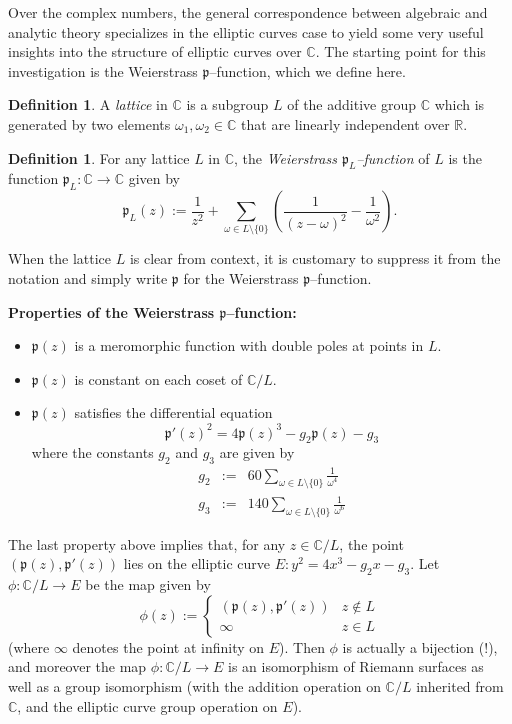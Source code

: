 \documentclass[12pt]{article}
\newcommand{\p}{{\mathfrak{p}}}
\newcommand{\C}{\mathbb{C}}
\newcommand{\R}{\mathbb{R}}
\theoremstyle{definition}
\newtheorem{definition}[theorem]{Definition}
\begin{document}
Over the complex numbers, the general correspondence between algebraic and analytic theory specializes in the elliptic curves case to yield some very useful insights into the structure of elliptic curves over $\mathbb{C}$. The starting point for this investigation is the Weierstrass $\p$--function, which we define here.

\begin{definition}
A {\em lattice} in $\C$ is a subgroup $L$ of the additive group $\mathbb{C}$ which is generated by two elements $\omega_1, \omega_2 \in \C$ that are linearly independent over $\R$.
\end{definition}

\begin{definition}
For any lattice $L$ in $\C$, the {\em Weierstrass $\p_L$--function} of $L$ is the function $\p_L: \C \longrightarrow \C$ given by
$$
\p_L(z) := \frac{1}{z^2} + \sum_{\omega \in L \setminus \{0\}} \left( \frac{1}{(z-\omega)^2} - \frac{1}{\omega^2}\right).
$$
\end{definition}

When the lattice $L$ is clear from context, it is customary to suppress it from the notation and simply write $\p$ for the Weierstrass $\p$--function.

{\bf Properties of the Weierstrass $\p$--function:}

\begin{itemize}
\item $\p(z)$ is a meromorphic function with double poles at points in $L$.
\item $\p(z)$ is constant on each coset of $\C/L$.
\item $\p(z)$ satisfies the differential equation
$$
\p'(z)^2 = 4 \p(z)^3 - g_2 \p(z) - g_3
$$
where the constants $g_2$ and $g_3$ are given by
\begin{eqnarray*}
g_2 & := & 60 \sum_{\omega \in L \setminus \{0\}} \frac{1}{\omega^4} \\
g_3 & := & 140 \sum_{\omega \in L \setminus \{0\}} \frac{1}{\omega^6}
\end{eqnarray*}
\end{itemize}

The last property above implies that, for any $z \in \C/L$, the point $(\p(z),\p'(z))$ lies on the elliptic curve $E: y^2 = 4x^3 - g_2 x - g_3$. Let $\phi: \C/L \longrightarrow E$ be the map given by
$$
\phi(z) := 
\begin{cases}
(\p(z),\p'(z)) & z \notin L \\
\infty & z \in L
\end{cases}
$$
(where $\infty$ denotes the point at infinity on $E$). Then $\phi$ is actually a bijection (!), and moreover the map $\phi: \C/L \longrightarrow E$ is an isomorphism of Riemann surfaces as well as a group isomorphism (with the addition operation on $\C/L$ inherited from $\C$, and the elliptic curve group operation on $E$).
\end{document}
